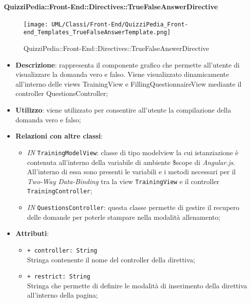 
		\paragraph{QuizziPedia::Front-End::Directives::TrueFalseAnswerDirective}
		
		\label{QuizziPedia::Front-End::Directives::TrueFalseAnswerDirective}
		
		\begin{figure}[ht]
			\centering
			\texttt{[image: UML/Classi/Front-End/QuizziPedia\_Front-end\_Templates\_TrueFalseAnswerTemplate.png]}
			\caption{QuizziPedia::Front-End::Directives::TrueFalseAnswerDirective}
		\end{figure} \FloatBarrier
		
		\begin{itemize}
			\item \textbf{Descrizione}: rappresenta il componente grafico che permette all'utente di visualizzare la domanda vero e falso. Viene visualizzato dinamicamente all'interno delle views TrainingView e FillingQuestionnaireView mediante il controller QuestionsController;
			\item \textbf{Utilizzo}: viene utilizzato per consentire all'utente la compilazione della domanda vero e falso;
			\item \textbf{Relazioni con altre classi}: 
			\begin{itemize}
				\item \textit{IN} \texttt{TrainingModelView}: classe di tipo modelview la cui istanziazione è contenuta all'interno della variabile di ambiente \$scope di \textit{Angular.js}. All'interno di essa sono presenti le variabili e i metodi necessari per il \textit{Two-Way Data-Binding} tra la view \texttt{TrainingView} e il controller \texttt{TrainingController}; 
				\item \textit{IN} \texttt{QuestionsController}: questa classe permette di gestire il recupero delle domande per poterle stampare nella modalità allenamento;
			\end{itemize}
			\item \textbf{Attributi}: 
			\begin{itemize}
				\item \texttt{+ controller: String} \\ Stringa contenente il nome del controller della direttiva;
				\item \texttt{+ restrict: String} \\ Stringa che permette di definire le modalità di inserimento della direttiva all'interno della pagina;

\end{itemize}
\end{itemize}

